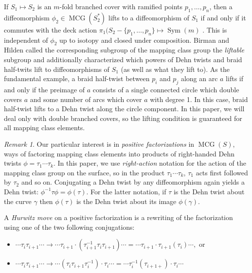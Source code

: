 \documentclass[11pt,letterpaper,reqno]{amsart}
\theoremstyle{remark}
\newtheorem{remark}[theorem]{Remark}
\DeclareMathOperator{\MCG}{MCG}
\DeclareMathOperator{\Sym}{Sym}
\def \t {\tau}
\begin{document}
If $S_1 \mapsto S_2$ is an $m$-fold branched cover with ramified points $p_1, \dots, p_n$, then a diffeomorphism $\phi_2\in \MCG(S_2^*)$ lifts to a diffeomorphism of $S_1$ if and only if it commutes with the deck action $\pi_1(S_2 -\{p_1, \dots, p_n\} \mapsto \Sym(m)$ \cite{BirmanHilden}. This is independent of $\phi_2$ up to isotopy and closed under composition. Birman and Hilden called the corresponding subgroup of the mapping class group the \emph{liftable} subgroup and additionally characterized which powers of Dehn twists and braid half-twits lift to diffeomorphisms of $S_1$ (as well as what they lift to). As the fundamental example, a braid half-twist between $p_i$ and $p_j$ along an arc $a$ lifts if and only if the preimage of $a$ consists of a single connected circle which double covers $a$ and some number of arcs which cover $a$ with degree 1. In this case, braid half-twist lifts to a Dehn twist along the circle component. In this paper, we will deal only with double branched covers, so the lifting condition is guaranteed for all mapping class elements. 

\begin{remark} Our particular interest is in \emph{positive factorizations} in $\MCG(S)$, ways of factoring mapping class elements into products of right-handed Dehn twists $\phi = \t_1 \cdots \t_k$. In this paper, we use \emph{right-action} notation for the action of the mapping class group on the surface, so in the product $\t_1 \cdots \t_k$, $\t_1$ acts first followed by $\t_2$ and so on. Conjugating a Dehn twist by any diffeomorphism again yields a Dehn twist: $\phi^{-1} \t \phi = \phi(\t)$. For the latter notation, if $\t$ is the Dehn twist about the curve $\gamma$ then $\phi(\t)$ is the Dehn twist about its image $\phi(\gamma)$. \end{remark}

A \emph{Hurwitz move} on a positive factorization is a rewriting of the factorization using one of the two following conjugations:

\begin{itemize}
    \item $\cdots \t_i \t_{i+1} \cdots \rightarrow \cdots \t_{i+1} \cdot ( \t_{i+1}^{-1} \t_{i} \t_{i+1}) \cdots = \cdots \t_{i+1} \cdot \t_{i+1}(\t_i) \cdots,$ or
    \item $\cdots \t_i \t_{i+1} \cdots \rightarrow \cdots (\t_{i} \t_{i+1} \t_i^{-1}) \cdot \t_i \cdots = \cdots \t_i^{-1}(\t_{i+1+}) \cdot \t_i \cdots$
\end{itemize}
\end{document}
